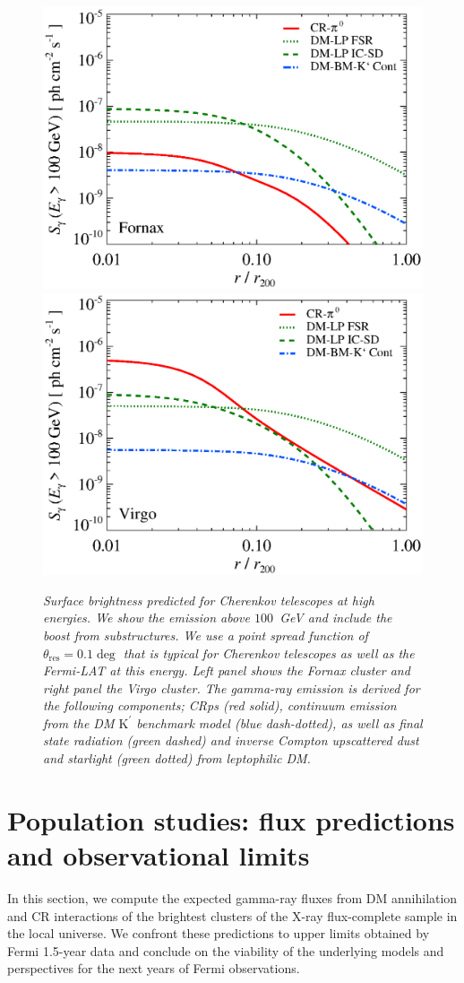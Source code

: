 \documentclass[10pt,aps,pra,reprint,amsmath,amsfonts,amssymb,showpacs,nofootinbib,floatfix]{revtex4-1}
\newcommand{\rmn}{\mathrm}
\newcommand{\psf}{\theta_\rmn{res}}
\newcommand{\Kp}{\rmn{K}^\prime}
\begin{document}
\begin{figure}
\begin{minipage}{2.0\columnwidth}
  \includegraphics[width=0.49\columnwidth]{figures/SB.Fornax.v11.SF300.SubMass.elmu.eps}
  \includegraphics[width=0.49\columnwidth]{figures/SB.Virgo.v11.SF300.SubMass.elmu.eps}
\caption{\it Surface brightness predicted for Cherenkov telescopes at
  high energies. We show the emission above $100$~GeV and include the
  boost from substructures. We use a point spread function of
  $\psf=0.1\deg$ that is typical for Cherenkov
  telescopes as well as the Fermi-LAT at this energy. Left panel shows
  the Fornax cluster and right panel the Virgo cluster. The gamma-ray
  emission is derived for the following components; CRps (red solid),
  continuum emission from the DM $\Kp$ benchmark model (blue
  dash-dotted), as well as final state radiation (green dashed) and
  inverse Compton upscattered dust and starlight (green dotted) from
  leptophilic DM.}
 \label{fig:SB_IACTs}
\end{minipage}
\end{figure}



\section{Population studies: flux predictions and observational limits}

In this section, we compute the expected gamma-ray fluxes from DM
annihilation and CR interactions of the brightest clusters of the
X-ray flux-complete sample in the local universe. We confront these
predictions to upper limits obtained by Fermi 1.5-year data and
conclude on the viability of the underlying models and perspectives
for the next years of Fermi observations.
\end{document}
